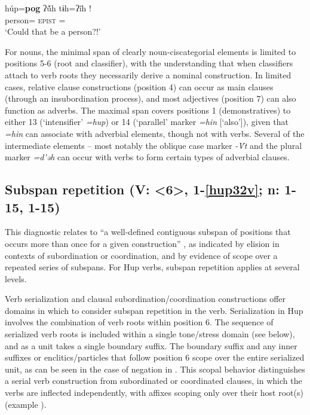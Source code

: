 \documentclass[output=paper]{langscibook}
\begin{document}
\ea\label{ex:hup:key:21}
\gll húp=\textbf{pog} ʔ\'{\~u}h   tɨh=ʔ\~ih !\\ 
person=\Emph{} \textsc{epist} \Third\Sg=\M{}\\ 
\glt `Could that be a person?!'
\z 

For nouns, the minimal span of clearly noun-ciscategorial elements is limited to positions 5-6 (root and classifier), with the understanding that when classifiers attach to verb roots they necessarily derive a nominal construction. In limited cases, relative clause constructions (position 4) can occur as main clauses (through an insubordination process), and most adjectives (position 7) can also function as adverbs. The maximal span covers positions 1 (demonstratives) to either 13 (`intensifier' \textit{=hup}) or 14 (`parallel' marker \textit{=hin} [`also']), given that \textit{=hin} can associate with adverbial elements, though not with verbs. Several of the intermediate elements – most notably the oblique case marker \textit{{}-\'{V}t} and the plural marker \textit{=d'ǝh} can occur with verbs to form certain types of adverbial clauses.


\subsection{Subspan repetition (V: <6>, 1-\ref{hup32v}; n: 1-15, 1-15)} 
\label{sec:hup:key:4.4}

This diagnostic relates to ``a well-defined contiguous subspan of positions that occurs more than once for a given construction'' \citep[337]{Tallman2021}, as indicated by elision in contexts of subordination or coordination, and by evidence of scope over a repeated series of subspans. For Hup verbs, subspan repetition applies at several levels. 

Verb serialization and clausal subordination/coordination constructions offer domains in which to consider subspan repetition in the verb. Serialization in Hup involves the combination of verb roots within position 6. The sequence of serialized verb roots is included within a single tone/stress domain (see  below), and as a unit takes a single boundary suffix. The boundary suffix and any inner suffixes or enclitics/particles that follow position 6 scope over the entire serialized unit, as can be seen in the case of negation in . This scopal behavior distinguishes a serial verb construction from subordinated or coordinated clauses, in which the verbs are inflected independently, with affixes scoping only over their host root(s) (example ).
\end{document}
